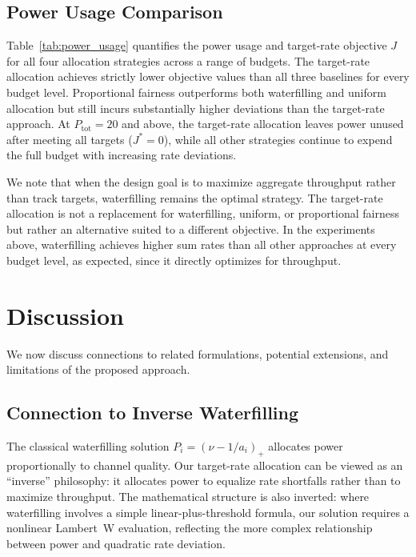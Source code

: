 \documentclass[journal]{IEEEtran}
\begin{document}
\subsection{Power Usage Comparison}

Table~\ref{tab:power_usage} quantifies the power usage and target-rate objective $J$ for all four allocation strategies across a range of budgets.
The target-rate allocation achieves strictly lower objective values than all three baselines for every budget level.
Proportional fairness outperforms both waterfilling and uniform allocation but still incurs substantially higher deviations than the target-rate approach.
At $P_{\mathrm{tot}} = 20$ and above, the target-rate allocation leaves power unused after meeting all targets ($J^* = 0$), while all other strategies continue to expend the full budget with increasing rate deviations.

We note that when the design goal is to maximize aggregate throughput rather than track targets, waterfilling remains the optimal strategy.
The target-rate allocation is not a replacement for waterfilling, uniform, or proportional fairness but rather an alternative suited to a different objective.
In the experiments above, waterfilling achieves higher sum rates than all other approaches at every budget level, as expected, since it directly optimizes for throughput.

\section{Discussion}
\label{sec:discussion}

We now discuss connections to related formulations, potential extensions, and limitations of the proposed approach.

\subsection{Connection to Inverse Waterfilling}

The classical waterfilling solution $P_i = (\nu - 1/a_i)_+$ allocates power proportionally to channel quality.
Our target-rate allocation can be viewed as an ``inverse'' philosophy: it allocates power to equalize rate shortfalls rather than to maximize throughput.
The mathematical structure is also inverted: where waterfilling involves a simple linear-plus-threshold formula, our solution requires a nonlinear Lambert~W evaluation, reflecting the more complex relationship between power and quadratic rate deviation.
\end{document}
